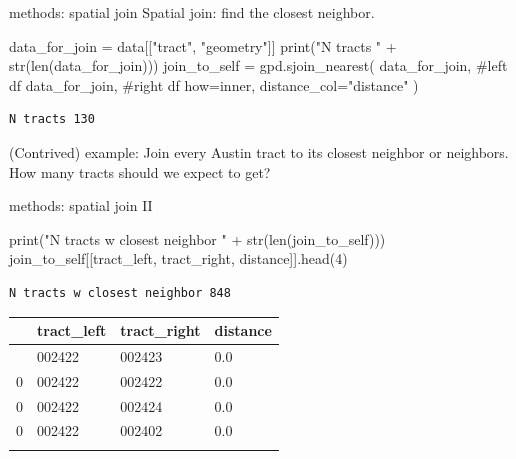 \documentclass[
  ignorenonframetext,
]{beamer}
\newenvironment{Shaded}{\begin{snugshade}}{\end{snugshade}}
\newcommand{\BuiltInTok}[1]{\textcolor[rgb]{0.00,0.23,0.31}{#1}}
\newcommand{\CommentTok}[1]{\textcolor[rgb]{0.37,0.37,0.37}{#1}}
\newcommand{\DecValTok}[1]{\textcolor[rgb]{0.68,0.00,0.00}{#1}}
\newcommand{\NormalTok}[1]{\textcolor[rgb]{0.00,0.23,0.31}{#1}}
\newcommand{\OperatorTok}[1]{\textcolor[rgb]{0.37,0.37,0.37}{#1}}
\newcommand{\StringTok}[1]{\textcolor[rgb]{0.13,0.47,0.30}{#1}}
\begin{document}
\begin{frame}[fragile]{methods: spatial join}
\label{methods-spatial-join}
Spatial join: find the closest neighbor.

\begin{Shaded}
\begin{Highlighting}[]
\NormalTok{data\_for\_join }\OperatorTok{=}\NormalTok{ data[[}\StringTok{"tract"}\NormalTok{, }\StringTok{"geometry"}\NormalTok{]]}
\BuiltInTok{print}\NormalTok{(}\StringTok{"N tracts "} \OperatorTok{+} \BuiltInTok{str}\NormalTok{(}\BuiltInTok{len}\NormalTok{(data\_for\_join)))}
\NormalTok{join\_to\_self }\OperatorTok{=}\NormalTok{ gpd.sjoin\_nearest(}
\NormalTok{    data\_for\_join,  }\CommentTok{\#left df}
\NormalTok{    data\_for\_join, }\CommentTok{\#right df}
\NormalTok{    how}\OperatorTok{=}\StringTok{\textquotesingle{}inner\textquotesingle{}}\NormalTok{, }
\NormalTok{    distance\_col}\OperatorTok{=}\StringTok{"distance"}
\NormalTok{)}
\end{Highlighting}
\end{Shaded}

\begin{verbatim}
N tracts 130
\end{verbatim}

(Contrived) example: Join every Austin tract to its closest neighbor or
neighbors. How many tracts should we expect to get?
\end{frame}

\begin{frame}[fragile]{methods: spatial join II}
\label{methods-spatial-join-ii}
\begin{Shaded}
\begin{Highlighting}[]
\BuiltInTok{print}\NormalTok{(}\StringTok{"N tracts w closest neighbor "} \OperatorTok{+} 
    \BuiltInTok{str}\NormalTok{(}\BuiltInTok{len}\NormalTok{(join\_to\_self)))}
\NormalTok{join\_to\_self[[}\StringTok{\textquotesingle{}tract\_left\textquotesingle{}}\NormalTok{, }\StringTok{\textquotesingle{}tract\_right\textquotesingle{}}\NormalTok{, }\StringTok{\textquotesingle{}distance\textquotesingle{}}\NormalTok{]].head(}\DecValTok{4}\NormalTok{)}
\end{Highlighting}
\end{Shaded}

\begin{verbatim}
N tracts w closest neighbor 848
\end{verbatim}

\begin{longtable}[]{@{}llll@{}}
\toprule\noalign{}
& tract\_left & tract\_right & distance \\
\midrule\noalign{}
\endhead
0 & 002422 & 002423 & 0.0 \\
0 & 002422 & 002422 & 0.0 \\
0 & 002422 & 002424 & 0.0 \\
0 & 002422 & 002402 & 0.0 \\
\bottomrule\noalign{}
\end{longtable}
\end{frame}
\end{document}
